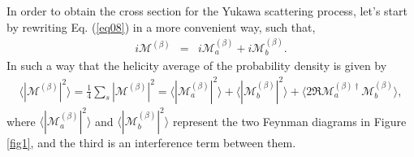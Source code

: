 \documentclass[11pt,showpacs,preprintnumbers,amsmath,amssymb,prd,nofootinbib,superscriptaddress]{revtex4-2}
\begin{document}
In order to obtain the cross section for the Yukawa scattering process, let's start by rewriting Eq. (\ref{eq08}) in a more convenient way, such that,\begin{eqnarray}
    i\mathcal{M}^{(\beta)}&=& i\mathcal{M}_{a}^{(\beta)}+i\mathcal{M}_{b}^{(\beta)}.
\end{eqnarray}
In such a way that the helicity average of the probability density is given by
\begin{eqnarray}
    \langle|\mathcal{M}^{(\beta)}|^2\rangle =\frac{1}{4}\sum_{s}|\mathcal{M}^{(\beta)}|^2=\bigl\langle|\mathcal{M}^{(\beta)}_{a}|^2\bigr\rangle +\bigl\langle|\mathcal{M}^{(\beta)}_{b}|^2\bigr\rangle +\bigl\langle2\Re{\mathcal{M}_{a}^{(\beta)\dagger}\mathcal{M}_{b}^{(\beta)}}\bigr\rangle,\label{Mvalue}
\end{eqnarray}
where $\langle|\mathcal{M}_{a}^{(\beta)}|^2\rangle$ and $\langle|\mathcal{M}_{b}^{(\beta)}|^2\rangle$ represent the two Feynman diagrams in Figure \ref{fig1}, and the third is an interference term between them.
\end{document}
